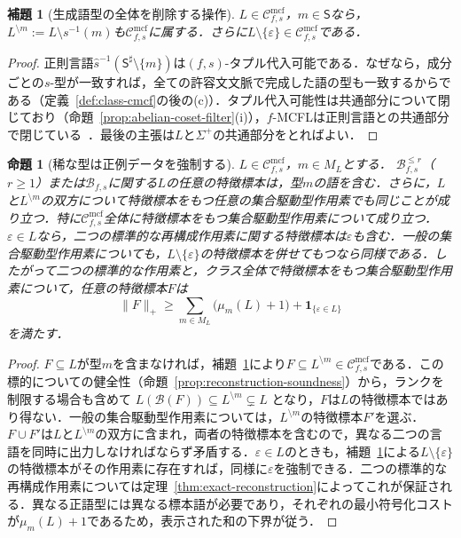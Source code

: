 \documentclass[11pt,a4paper]{ltjsarticle}
\numberwithin{equation}{section}
\theoremstyle{plain}
\newtheorem{lemma}[theorem]{補題}
\newtheorem{proposition}[theorem]{命題}
\theoremstyle{definition}
\theoremstyle{remark}
\newcommand{\Cmcf}[2]{\mathcal{C}^{\mathrm{mcf}}_{#1,#2}}
\newcommand{\eps}{\varepsilon}
\begin{document}
\begin{lemma}[生成語型の全体を削除する操作]
\label{lem:type-deletion}
$L\in\Cmcf{f}{s}$，$m\in\mathsf S$なら，
$L^{\setminus m}:=L\setminus s^{-1}(m)$も$\Cmcf{f}{s}$に属する．さらに$L\setminus\{\eps\}\in\Cmcf{f}{s}$である．
\end{lemma}
\begin{proof}
正則言語$\widehat s^{-1}(\mathsf S^\sharp\setminus\{m\})$は$(f,s)$-タプル代入可能である．なぜなら，成分ごとの$s$-型が一致すれば，全ての許容文文脈で完成した語の型も一致するからである（定義~\ref{def:class-cmcf}の後の(c)）．タプル代入可能性は共通部分について閉じており（命題~\ref{prop:abelian-coset-filter}(i)），$f$-MCFLは正則言語との共通部分で閉じている~\cite{SekiEtAl1991}．最後の主張は$L$と$\Sigma^+$の共通部分をとればよい．
\end{proof}

\begin{proposition}[稀な型は正例データを強制する]
\label{prop:rare-type}
$L\in\Cmcf{f}{s}$，$m\in M_L$とする．
$\mathcal B^{\le r}_{f,s}$（$r\ge1$）または$\mathcal B_{f,s}$に関する$L$の任意の特徴標本は，型$m$の語を含む．さらに，$L$と$L^{\setminus m}$の双方について特徴標本をもつ任意の集合駆動型作用素でも同じことが成り立つ．特に$\Cmcf{f}{s}$全体に特徴標本をもつ集合駆動型作用素について成り立つ．
$\eps\in L$なら，二つの標準的な再構成作用素に関する特徴標本は$\eps$も含む．一般の集合駆動型作用素についても，$L\setminus\{\eps\}$の特徴標本を併せてもつなら同様である．したがって二つの標準的な作用素と，クラス全体で特徴標本をもつ集合駆動型作用素について，任意の特徴標本$F$は
\[
 \|F\|_+\ge
 \sum_{m\in M_L}\bigl(\mu_m(L)+1\bigr)
 +\mathbf 1_{\{\eps\in L\}}
\]
を満たす．
\end{proposition}
\begin{proof}
$F\subseteq L$が型$m$を含まなければ，補題~\ref{lem:type-deletion}により$F\subseteq L^{\setminus m}\in\Cmcf{f}{s}$である．この標的についての健全性（命題~\ref{prop:reconstruction-soundness}）から，ランクを制限する場合も含めて
$L(\mathcal B(F))\subseteq L^{\setminus m}\subsetneq L$
となり，$F$は$L$の特徴標本ではあり得ない．一般の集合駆動型作用素については，$L^{\setminus m}$の特徴標本$F'$を選ぶ．$F\cup F'$は$L$と$L^{\setminus m}$の双方に含まれ，両者の特徴標本を含むので，異なる二つの言語を同時に出力しなければならず矛盾する．$\eps\in L$のときも，補題~\ref{lem:type-deletion}による$L\setminus\{\eps\}$の特徴標本がその作用素に存在すれば，同様に$\eps$を強制できる．二つの標準的な再構成作用素については定理~\ref{thm:exact-reconstruction}によってこれが保証される．異なる正語型には異なる標本語が必要であり，それぞれの最小符号化コストが$\mu_m(L)+1$であるため，表示された和の下界が従う．
\end{proof}
\end{document}
